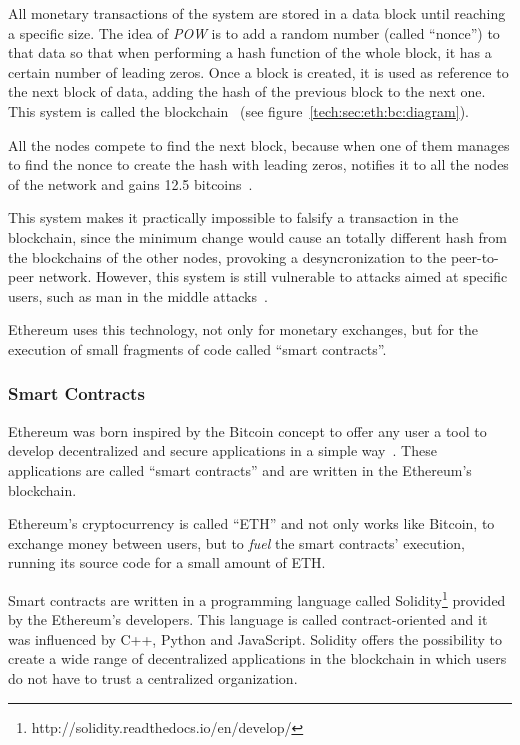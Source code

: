 All monetary transactions of the system are stored in a data block until
reaching a specific size. The idea of \emph{POW} is to add a random number
(called ``nonce'') to that data so that when performing a hash function of the
whole block, it has a certain number of leading zeros. Once a block is created,
it is used as reference to the next block of data, adding the hash of the
previous block to the next one. This system is called the
blockchain~\cite{antonopoulos2014mastering} (see
figure~\ref{tech:sec:eth:bc:diagram}).


All the nodes compete to find the next block, because when one of them manages
to find the nonce to create the hash with leading zeros, notifies it to all the
nodes of the network and gains 12.5 bitcoins~\cite{barber2012bitter}.

This system makes it practically impossible to falsify a transaction in the
blockchain, since the minimum change would cause an totally different hash from
the blockchains of the other nodes, provoking a desyncronization to the
peer-to-peer network. However, this system is still vulnerable to attacks aimed
at specific users, such as man in the middle attacks~\cite{moore2013beware}.

Ethereum uses this technology, not only for monetary exchanges, but for the
execution of small fragments of code called ``smart contracts''.

\subsubsection{Smart Contracts}
\label{tech:sec:ethereum:sm}

Ethereum was born inspired by the Bitcoin concept to offer any user a tool to
develop decentralized and secure applications in a simple
way~\cite{buterin2014ethereum}. These applications are called ``smart
contracts'' and are written in the Ethereum's blockchain.

Ethereum's cryptocurrency is called ``ETH'' and not only works like Bitcoin, to
exchange money between users, but to \emph{fuel} the smart contracts' execution,
running its source code for a small amount of ETH.

Smart contracts are written in a programming language called
Solidity\footnote{http://solidity.readthedocs.io/en/develop/} provided by the
Ethereum's developers. This language is called contract-oriented and it was
influenced by C++, Python and JavaScript. Solidity offers the possibility to
create a wide range of decentralized applications in the blockchain in which
users do not have to trust a centralized organization.

